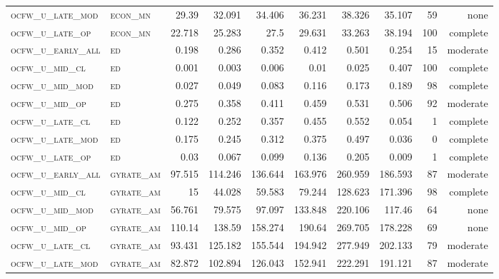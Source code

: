 \begin{landscape}
\begin{center}
\begin{footnotesize}
\begin{longtable}{llrrrrr|rrr}
\textsc{ocfw\_u\_late\_mod } & \textsc{econ\_mn  }    & 29.39    & 32.091   & 34.406   & 36.231   & 38.326   & 35.107   & 59  & none     \\
\textsc{ocfw\_u\_late\_op  } & \textsc{econ\_mn  }    & 22.718   & 25.283   & 27.5     & 29.631   & 33.263   & 38.194   & 100 & complete \\
\textsc{ocfw\_u\_early\_all} & \textsc{ed        }    & 0.198    & 0.286    & 0.352    & 0.412    & 0.501    & 0.254    & 15  & moderate \\
\textsc{ocfw\_u\_mid\_cl   } & \textsc{ed        }    & 0.001    & 0.003    & 0.006    & 0.01     & 0.025    & 0.407    & 100 & complete \\
\textsc{ocfw\_u\_mid\_mod  } & \textsc{ed        }    & 0.027    & 0.049    & 0.083    & 0.116    & 0.173    & 0.189    & 98  & complete \\
\textsc{ocfw\_u\_mid\_op   } & \textsc{ed        }    & 0.275    & 0.358    & 0.411    & 0.459    & 0.531    & 0.506    & 92  & moderate \\
\textsc{ocfw\_u\_late\_cl  } & \textsc{ed        }    & 0.122    & 0.252    & 0.357    & 0.455    & 0.552    & 0.054    & 1   & complete \\
\textsc{ocfw\_u\_late\_mod } & \textsc{ed        }    & 0.175    & 0.245    & 0.312    & 0.375    & 0.497    & 0.036    & 0   & complete \\
\textsc{ocfw\_u\_late\_op  } & \textsc{ed        }    & 0.03     & 0.067    & 0.099    & 0.136    & 0.205    & 0.009    & 1   & complete \\
\textsc{ocfw\_u\_early\_all} & \textsc{gyrate\_am}    & 97.515   & 114.246  & 136.644  & 163.976  & 260.959  & 186.593  & 87  & moderate \\
\textsc{ocfw\_u\_mid\_cl   } & \textsc{gyrate\_am}    & 15       & 44.028   & 59.583   & 79.244   & 128.623  & 171.396  & 98  & complete \\
\textsc{ocfw\_u\_mid\_mod  } & \textsc{gyrate\_am}    & 56.761   & 79.575   & 97.097   & 133.848  & 220.106  & 117.46   & 64  & none     \\
\textsc{ocfw\_u\_mid\_op   } & \textsc{gyrate\_am}    & 110.14   & 138.59   & 158.274  & 190.64   & 269.705  & 178.228  & 69  & none     \\
\textsc{ocfw\_u\_late\_cl  } & \textsc{gyrate\_am}    & 93.431   & 125.182  & 155.544  & 194.942  & 277.949  & 202.133  & 79  & moderate \\
\textsc{ocfw\_u\_late\_mod } & \textsc{gyrate\_am}    & 82.872   & 102.894  & 126.043  & 152.941  & 222.291  & 191.121  & 87  & moderate \\

\end{longtable}
\end{footnotesize}
\end{center}
\end{landscape}
